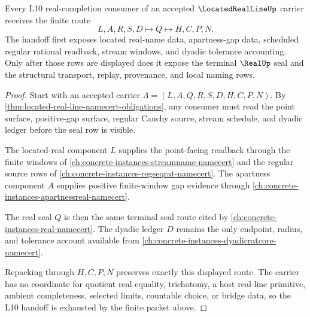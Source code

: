 \begin{theorem}
\label{thm:located-real-line-regular-cauchy-real-handoff}
Every L10 real-completion consumer of an accepted $\LocatedRealLineUp$ carrier receives the finite route
$$
L,A,R,S,D \longmapsto Q \longmapsto H,C,P,N .
$$
The handoff first exposes located real-name data, apartness-gap data, scheduled regular rational readback, stream windows, and dyadic tolerance accounting. Only after those rows are displayed does it expose the terminal $\RealUp$ seal and the structural transport, replay, provenance, and local naming rows.
\end{theorem}
\begin{proof}
Start with an accepted carrier $\Lambda=(L,A,Q,R,S,D,H,C,P,N)$. By \autoref{thm:located-real-line-namecert-obligations}, any consumer must read the point surface, positive-gap surface, regular Cauchy source, stream schedule, and dyadic ledger before the seal row is visible.

The located-real component $L$ supplies the point-facing readback through the finite windows of \autoref{ch:concrete-instances-streamname-namecert} and the regular source rows of \autoref{ch:concrete-instances-regseqrat-namecert}. The apartness component $A$ supplies positive finite-window gap evidence through \autoref{ch:concrete-instances-apartnessreal-namecert}.

The real seal $Q$ is then the same terminal seal route cited by \autoref{ch:concrete-instances-real-namecert}. The dyadic ledger $D$ remains the only endpoint, radius, and tolerance account available from \autoref{ch:concrete-instances-dyadicratcore-namecert}.

Repacking through $H,C,P,N$ preserves exactly this displayed route. The carrier has no coordinate for quotient real equality, trichotomy, a host real-line primitive, ambient completeness, selected limits, countable choice, or bridge data, so the L10 handoff is exhausted by the finite packet above.
\end{proof}


